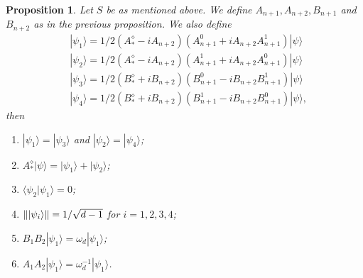 \documentclass[11pt,letterpaper]{article}
\newcommand{\ket}[1]{|#1\rangle}
\newcommand{\braket}[2]{\langle#1|#2\rangle}
\DeclarePairedDelimiter{\norm}{\lVert}{\rVert}
\newcommand{\1}{\mathbb{1}}
\newtheorem{proposition}[theorem]{Proposition}
\theoremstyle{definition}
\begin{document}
\begin{proposition}
	Let $S$ be as mentioned above. We define $A_{n+1}, A_{n+2},B_{n+1}$ and $B_{n+2}$ as in the previous proposition.
	We also define
	\begin{align}
		&\ket{\psi_1} =1/2 (A_\ast^\diamond - iA_{n+2})(A_{n+1}^0 + iA_{n+2}A_{n+1}^1) \ket{\psi} \\
		&\ket{\psi_2} = 1/2 (A_\ast^\diamond - iA_{n+2})(A_{n+1}^1 + iA_{n+2}A_{n+1}^0) \ket{\psi} \\
		&\ket{\psi_3} =1/2 (B_\ast^\diamond + i B_{n+2})(B_{n+1}^0 - iB_{n+2}B_{n+1}^1) \ket{\psi}  \\
		&\ket{\psi_4} =1/2 (B_\ast^\diamond + i B_{n+2})(B_{n+1}^1 - iB_{n+2}B_{n+1}^0) \ket{\psi},
	\end{align}
	then
	\begin{enumerate}
	\item $\ket{\psi_1} = \ket{\psi_3}$ and $\ket{\psi_2} = \ket{\psi_4}$; 
	\item $A_\ast^\diamond \ket{\psi} = \ket{\psi_1}+\ket{\psi_2}$;
	\item $\braket{\psi_2}{\psi_1} = 0$;
	\item $\norm{\ket{\psi_i}} = 1/\sqrt{d-1}$ for $i = 1, 2, 3, 4$;
	\item $B_1B_2 \ket{\psi_1} = \omega_d\ket{\psi_1}$;
	\item $A_1A_2 \ket{\psi_1} = \omega_d^{-1} \ket{\psi_1}$.
	\end{enumerate}
\end{proposition}
\end{document}
